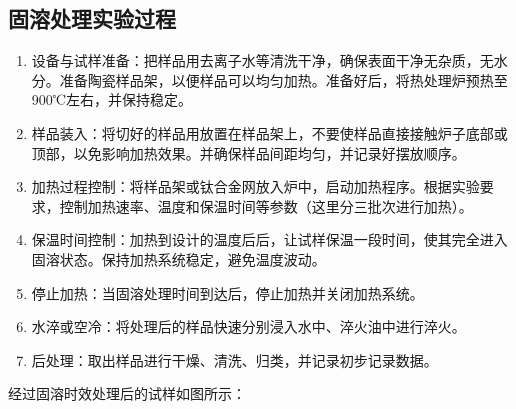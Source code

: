 \subsection{固溶处理实验过程}
\begin{enumerate}
	\item 设备与试样准备：把样品用去离子水等清洗干净，确保表面干净无杂质，无水分。准备陶瓷样品架，以便样品可以均匀加热。准备好后，将热处理炉预热至900℃左右，并保持稳定。
	\item 样品装入：将切好的样品用放置在样品架上，不要使样品直接接触炉子底部或顶部，以免影响加热效果。并确保样品间距均匀，并记录好摆放顺序。
	\item 加热过程控制：将样品架或钛合金网放入炉中，启动加热程序。根据实验要求，控制加热速率、温度和保温时间等参数（这里分三批次进行加热）。
	\item 保温时间控制：加热到设计的温度后后，让试样保温一段时间，使其完全进入固溶状态。保持加热系统稳定，避免温度波动。
	\item 停止加热：当固溶处理时间到达后，停止加热并关闭加热系统。
	\item 水淬或空冷：将处理后的样品快速分别浸入水中、淬火油中进行淬火。
	\item 后处理：取出样品进行干燥、清洗、归类，并记录初步记录数据。
\end{enumerate}
经过固溶时效处理后的试样如图所示：



